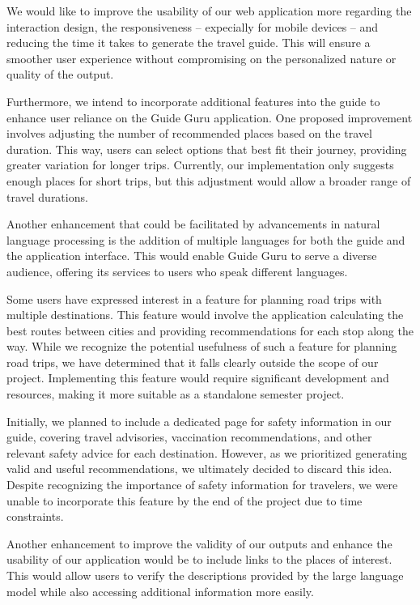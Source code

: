 \documentclass[english,notitlepage,smartquotes]{hgbreport}
\begin{document}
We would like to improve the usability of our web application more regarding the interaction design, the responsiveness -- expecially for mobile devices -- and reducing the time it takes to generate the travel guide. This will ensure a smoother user experience without compromising on the personalized nature or quality of the output.

Furthermore, we intend to incorporate additional features into the guide to enhance user reliance on the Guide Guru application. One proposed improvement involves adjusting the number of recommended places based on the travel duration. This way, users can select options that best fit their journey, providing greater variation for longer trips. Currently, our implementation only suggests enough places for short trips, but this adjustment would allow a broader range of travel durations.
 
Another enhancement that could be facilitated by advancements in natural language processing is the addition of multiple languages for both the guide and the application interface. This would enable Guide Guru to serve a diverse audience, offering its services to users who speak different languages.

Some users have expressed interest in a feature for planning road trips with multiple destinations. This feature would involve the application calculating the best routes between cities and providing recommendations for each stop along the way. While we recognize the potential usefulness of such a feature for planning road trips, we have determined that it falls clearly outside the scope of our project. Implementing this feature would require significant development and resources, making it more suitable as a standalone semester project.

Initially, we planned to include a dedicated page for safety information in our guide, covering travel advisories, vaccination recommendations, and other relevant safety advice for each destination. However, as we prioritized generating valid and useful recommendations, we ultimately decided to discard this idea. Despite recognizing the importance of safety information for travelers, we were unable to incorporate this feature by the end of the project due to time constraints.

Another enhancement to improve the validity of our outputs and enhance the usability of our application would be to include links to the places of interest. This would allow users to verify the descriptions provided by the large language model while also accessing additional information more easily.
\end{document}
